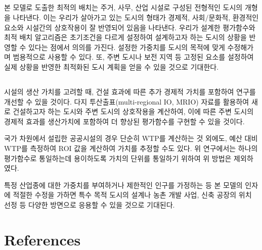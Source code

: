\documentclass[10pt]{article}
\begin{document}
\begin{multicols}{2}
\subsection{}

 본 모델로 도출한 최적의 배치는 주거, 사무, 산업 시설로 구성된 전형적인 도시의 개형을 나타낸다. 이는 우리가 살아가고 있는 도시의 형태가 경제적, 사회/문화적, 환경적인 요소와 시설간의 상호작용이 잘 반영되어 있음을 나타낸다. 우리가 설계한 평가함수와 최적 배치 알고리즘은 초기조건을 다르게 설정하여 설계하고자 하는 도시의 상황을 반영할 수 있다는 점에서 의의를 가진다. 설정한 가중치를 도시의 목적에 맞게 수정해가며 범용적으로 사용할 수 있다. 또, 주변 도시나 보전 지역 등 고정된 요소를 설정하여 실제 상황을 반영한 최적화된 도시 계획을 얻을 수 있을 것으로 기대한다.
 
\subsection{}
 시설의 생산 가치를 고려할 때, 건설 효과에 따른 추가 경제적 가치를 포함하여 연구를 개선할 수 있을 것이다. 다지 투산출표(multi-regional IO, MRIO) 자료를 활용하여 새로 건설하고자 하는 도시와 주변 도시의 상호작용을 계산하여\cite{chungnam_technical_report}, 이에 따른 주변 도시의 경제적 효과를 생산가치에 포함하여 더 향상된 평가함수를 구현할 수 있을 것이다.

국가 차원에서 설립한 공공시설의 경우 단순히 WTP를 계산하는 것 외에도, 예산 대비 WTP를 측정하여 ROI 값을 계산하여 가치를 추정할 수도 있다. 위 연구에서는 하나의 평가함수로 통일하는데 용이하도록 가치의 단위를 통일하기 위하여 위 방법은 제외하였다.
 
 특정 산업종에 대한 가중치를 부여하거나 제한적인 인구를 가정하는 등 본 모델의 인자에 적절한 수정을 가하면 특수 목적 도시의 설계나 농촌 개발 사업, 신축 공장의 위치 선정 등 다양한 방면으로 응용할 수 있을 것으로 기대된다.
\section{References}
\printbibliography

\end{multicols}
\end{document}
